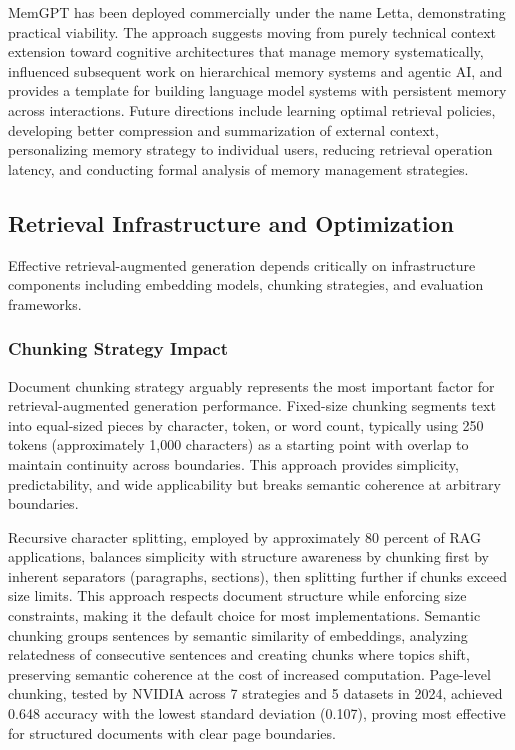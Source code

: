 \documentclass[11pt,letterpaper]{article}
\begin{document}
MemGPT has been deployed commercially under the name Letta, demonstrating practical viability. The approach suggests moving from purely technical context extension toward cognitive architectures that manage memory systematically, influenced subsequent work on hierarchical memory systems and agentic AI, and provides a template for building language model systems with persistent memory across interactions. Future directions include learning optimal retrieval policies, developing better compression and summarization of external context, personalizing memory strategy to individual users, reducing retrieval operation latency, and conducting formal analysis of memory management strategies.

\subsection{Retrieval Infrastructure and Optimization}

Effective retrieval-augmented generation depends critically on infrastructure components including embedding models, chunking strategies, and evaluation frameworks.

\subsubsection{Chunking Strategy Impact}

Document chunking strategy arguably represents the most important factor for retrieval-augmented generation performance. Fixed-size chunking segments text into equal-sized pieces by character, token, or word count, typically using 250 tokens (approximately 1,000 characters) as a starting point with overlap to maintain continuity across boundaries. This approach provides simplicity, predictability, and wide applicability but breaks semantic coherence at arbitrary boundaries.

Recursive character splitting, employed by approximately 80 percent of RAG applications, balances simplicity with structure awareness by chunking first by inherent separators (paragraphs, sections), then splitting further if chunks exceed size limits. This approach respects document structure while enforcing size constraints, making it the default choice for most implementations. Semantic chunking groups sentences by semantic similarity of embeddings, analyzing relatedness of consecutive sentences and creating chunks where topics shift, preserving semantic coherence at the cost of increased computation. Page-level chunking, tested by NVIDIA across 7 strategies and 5 datasets in 2024, achieved 0.648 accuracy with the lowest standard deviation (0.107), proving most effective for structured documents with clear page boundaries.
\end{document}
